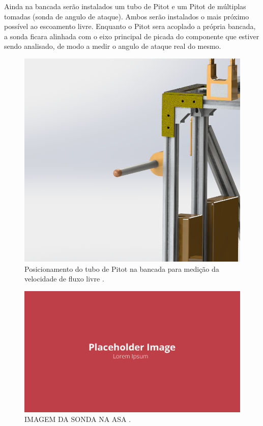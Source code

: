 Ainda na bancada serão instalados um tubo de Pitot e um Pitot de múltiplas tomadas (sonda de angulo de ataque). Ambos serão instalados o mais próximo possível ao escoamento livre. Enquanto o Pitot sera acoplado a própria bancada, a sonda ficara alinhada com o eixo principal de picada do componente que estiver sendo analisado, de modo a medir o angulo de ataque real do mesmo. 

\begin{figure}[!ht]
    \centering
    \includegraphics[width=.8\linewidth]{figuras/renders/detalhe_pitot_bancada.png}
    \caption{Posicionamento do tubo de Pitot na bancada para medição da velocidade de fluxo livre \cite{autor}.}
    \label{fig:placeholder}
\end{figure}

\begin{figure}[!ht]
    \centering
    \includegraphics[width=.8\linewidth]{figuras/placeholder.png}
    \caption{IMAGEM DA SONDA NA ASA \cite{autor}.}
    \label{fig:placeholder}
\end{figure}

